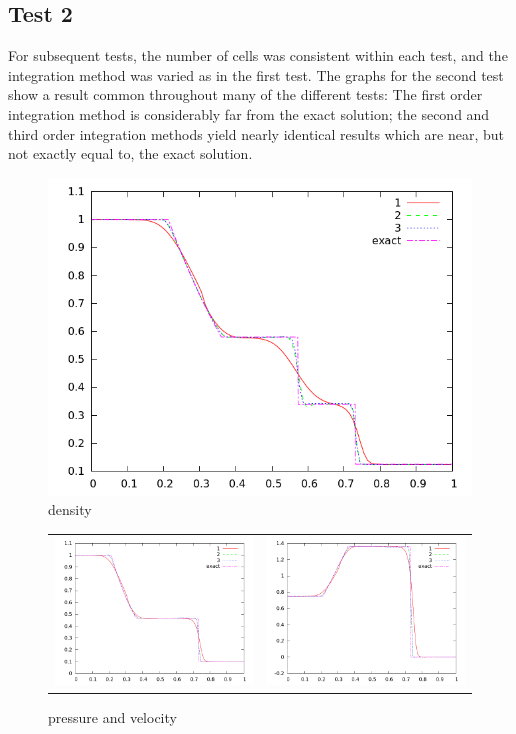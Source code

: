 \documentclass[10pt,preprint]{aastex}
\begin{document}
\subsection{Test 2}
For subsequent tests, the number of cells was consistent within each test, and the integration method was varied as in the first test. 
The graphs for the second test show a result common throughout many of the different tests: The first order integration method is considerably far from the exact solution; the second and third order integration methods yield nearly identical results which are near, but not exactly equal to, the exact solution. 
\begin{figure}[h]
  \begin{center}
     \includegraphics[width=.78\textwidth]{den_T2.png}	
  \end{center}
  \caption{density}
\end{figure}

\begin{figure}
  \begin{center}
	\begin{tabular}{cc}
      \includegraphics[width=.425\textwidth]{prs_T2.png} &
	  \includegraphics[width=.425\textwidth]{vel_T2.png}
	\end{tabular}
  \end{center}
  \caption{pressure and velocity}
\end{figure}
\end{document}
